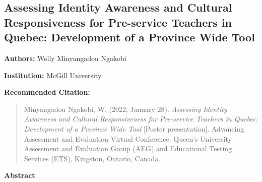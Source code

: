 \documentclass[
]{book}
\begin{document}
\newpage

\hypertarget{assessing-identity-awareness-and-cultural-responsiveness-for-pre-service-teachers-in-quebec-development-of-a-province-wide-tool}{%
\subsection{Assessing Identity Awareness and Cultural Responsiveness for Pre-service Teachers in Quebec: Development of a Province Wide Tool}\label{assessing-identity-awareness-and-cultural-responsiveness-for-pre-service-teachers-in-quebec-development-of-a-province-wide-tool}}

\textbf{Authors:} Welly Minyangadou Ngokobi

\textbf{Institution:} McGill University

\textbf{Recommended Citation:}

\begin{quote}
Minyangadou Ngokobi, W. (2022, January 28). \emph{Assessing Identity Awareness and Cultural Responsiveness for Pre-service Teachers in Quebec: Development of a Province Wide Tool} {[}Poster presentation{]}. Advancing Assessment and Evaluation Virtual Conference: Queen's University Assessment and Evaluation Group (AEG) and Educational Testing Services (ETS), Kingston, Ontario, Canada.
\end{quote}

\textbf{Abstract}
\end{document}
